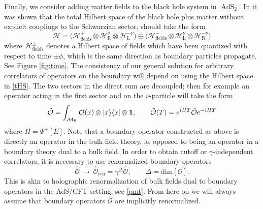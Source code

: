 \documentclass[12pt]{article}
\newcommand{\be}{\begin{equation}}
\newcommand{\ee}{\end{equation}}
\newcommand*{\bra}[1]{\langle{#1}|}
\newcommand*{\ket}[1]{|{#1}\rangle}
\newcommand{\calH}{\mathcal{H}}
\newcommand{\calM}{\mathcal{M}}
\newcommand{\calO}{\mathcal{O}}
\DeclareMathOperator{\ren}{ren}
\DeclareMathOperator{\tAdS}{\widetilde{AdS}}
\newcommand{\la}{\text{L}}
\newcommand{\ra}{\text{R}}
\newcommand{\unit}{\mathbf{1}}
\newcommand{\ga}{\gamma}
\newcommand{\De}{\Delta}
\def\widetilde#1{#1}%
\begin{document}
Finally, we consider adding matter fields to the black hole system in $\tAdS_2$. In \cite{KiSuh18} it was shown that the total Hilbert space of the black hole plus matter without explicit couplings to the Schwarzian sector, should take the form
\begin{equation}\label{tHS}
\calH = \bigl(\calH_{\text{fields}}^{+}
\otimes\calH^{\nu}_{\ra}\otimes\calH^{-\nu}_{\la}\bigr)
\oplus\bigl(\calH_{\text{fields}}^{-}
\otimes\calH^{\nu}_{\la}\otimes\calH^{-\nu}_{\ra}\bigr)
\end{equation}
where $\calH_{\text{fields}}^{\pm}$ denotes a Hilbert space of fields which have been quantized with respect to time $\pm\phi$, which is the same direction as boundary particles propagate. See Figure \ref{fig:time}. The consistency of our general solution for arbitrary correlators of operators on the boundary will depend on using the Hilbert space in \eqref{tHS}. The two sectors in the direct sum are decoupled; then for example an operator acting in the first sector and on the $\nu$-particle will take the form
\be\label{O_R}
\hat{\calO}
=\int_{\calM_{\rm R}} \calO(x)\otimes \ket{x}\bra{x}\otimes \unit,\qquad
\hat{\calO}(T)=e^{iHT}\hat{\calO}e^{-iH T}
\ee
where $H=\Psi^{+}[E]$. Note that a boundary operator constructed as above is directly an operator in the bulk field theory, as opposed to being an operator in a boundary theory dual to a bulk field. In order to obtain cutoff or $\ga$-independent correlators, it is necessary to use renormalized boundary operators
\be \label{renorm}
\hat{\calO}\, \to \,\hat{\calO}_{\ren}=\ga^\De \hat{\calO}, \qquad \De=\text{dim}[\calO].
\ee
This is akin to holographic renormalization of bulk fields dual to boundary operators in the AdS/CFT setting, see \eqref{pmt}. From here on we will always assume that boundary operators $\hat{\calO}$ are implicitly renormalized.
\end{document}
